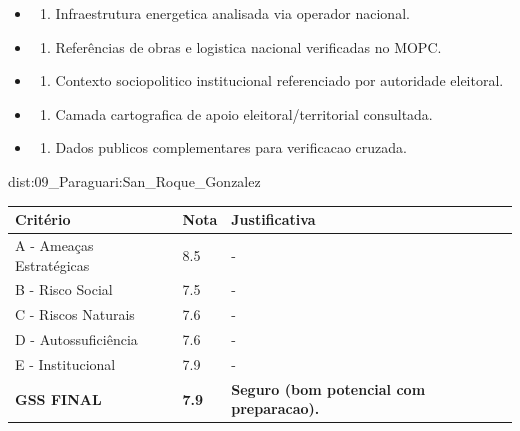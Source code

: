 {\begin{itemize}
\item
  \begin{enumerate}
  \def\labelenumi{\arabic{enumi})}
  \setcounter{enumi}{7}
  \tightlist
  \item
    Infraestrutura energetica analisada via operador nacional.
  \end{enumerate}
\item
  \begin{enumerate}
  \def\labelenumi{\arabic{enumi})}
  \setcounter{enumi}{8}
  \tightlist
  \item
    Referências de obras e logistica nacional verificadas no MOPC.
  \end{enumerate}
\item
  \begin{enumerate}
  \def\labelenumi{\arabic{enumi})}
  \setcounter{enumi}{9}
  \tightlist
  \item
    Contexto sociopolitico institucional referenciado por autoridade
    eleitoral.
  \end{enumerate}
\item
  \begin{enumerate}
  \def\labelenumi{\arabic{enumi})}
  \setcounter{enumi}{10}
  \tightlist
  \item
    Camada cartografica de apoio eleitoral/\allowbreak territorial consultada.
  \end{enumerate}
\item
  \begin{enumerate}
  \def\labelenumi{\arabic{enumi})}
  \setcounter{enumi}{11}
  \tightlist
  \item
    Dados publicos complementares para verificacao cruzada.
  \end{enumerate}
\end{itemize}}{dist:09_Paraguari:San_Roque_Gonzalez}
\begin{table}[ht!]
\small \begin{tabular}{p{3.0cm}p{0.8cm}p{6.0cm}} \toprule
\textbf{Critério} & \textbf{Nota} & \textbf{Justificativa} \\ \midrule
A - Ameaças Estratégicas & 8.5 & - \\
B - Risco Social & 7.5 & - \\
C - Riscos Naturais & 7.6 & - \\
D - Autossuficiência & 7.6 & - \\
E - Institucional & 7.9 & - \\
\midrule \textbf{GSS FINAL} & \textbf{7.9} & \textbf{Seguro (bom potencial com preparacao).} \\ \bottomrule \end{tabular}
\end{table}
